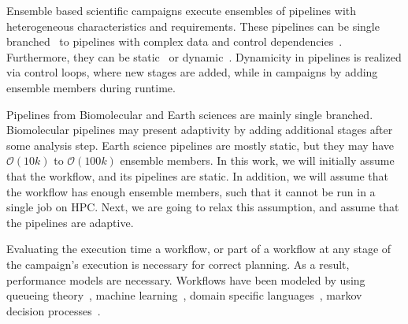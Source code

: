 
Ensemble based scientific campaigns execute ensembles of pipelines with 
heterogeneous characteristics and requirements. These pipelines can be single 
branched~\cite{paraskevakos2019workflow,dakka2018high,ramakrishnan_survey,
balasubramanian2018harnessing} to pipelines with complex data and control 
dependencies~\cite{ramakrishnan_survey,deelman2018future}. Furthermore, they 
can be static~\cite{paraskevakos2019workflow} or dynamic~\cite{dakka2018high,
balasubramanian2018harnessing}. Dynamicity in pipelines is realized via 
control loops, where new stages are added, while in campaigns by adding 
ensemble members during runtime.

Pipelines from Biomolecular and Earth sciences are mainly single branched. 
Biomolecular pipelines may present adaptivity by adding additional stages 
after some analysis step. Earth science pipelines are mostly static, but they 
may have $\mathcal{O}(10k)$ to $\mathcal{O}(100k)$ ensemble members. In this 
work, we will initially assume that the workflow, and its pipelines are 
static. In addition, we will assume that the workflow has enough ensemble 
members, such that it cannot be run in a single job on HPC. Next, we are 
going to relax this assumption, and assume that the pipelines are adaptive.


Evaluating the execution time a workflow, or part of a workflow at any stage 
of the campaign's execution is necessary for correct planning. As a result, 
performance models are necessary. Workflows have been modeled by using 
queueing theory~\cite{bao2019performance,yao2019throughput}, machine 
learning~\cite{witt2019predictive,pumma2017runtime}, domain specific 
languages~\cite{deelman2017performance,mandal2016toward}, markov decision 
processes~\cite{jia2005cost}.

